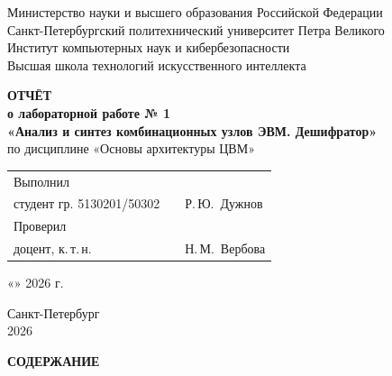 \documentclass[14pt,a4paper]{extarticle}
\makeatletter
\renewcommand{\tableofcontents}{%
  {\centering\textbf{СОДЕРЖАНИЕ}\par}\vspace{12pt}%
  \@starttoc{toc}}
\newcommand{\StudentGroup}{5130201/50302}
\makeatother
\begin{document}
\begin{titlepage}
\begin{singlespace}
\begin{center}
Министерство науки и высшего образования Российской Федерации\\[2pt]
Санкт-Петербургский политехнический университет Петра Великого\\[2pt]
Институт компьютерных наук и кибербезопасности\\[2pt]
Высшая школа технологий искусственного интеллекта

\vspace{5cm}

\textbf{ОТЧЁТ}\\[6pt]
\textbf{о лабораторной работе № 1}\\[12pt]
\textbf{«Анализ и синтез комбинационных узлов ЭВМ. Дешифратор»}\\[12pt]
по дисциплине «Основы архитектуры ЦВМ»
\end{center}

\vspace{4cm}

\noindent
\begin{tabular}{@{}p{7.2cm}p{3.6cm}l@{}}
Выполнил\\
студент гр. \StudentGroup & \underline{\hspace{3cm}} & Р.\,Ю.~Дужнов\\[22pt]
Проверил\\
доцент, к.\,т.\,н. & \underline{\hspace{3cm}} & Н.\,М.~Вербова\\
\end{tabular}

\vspace{1.2cm}
\noindent\hfill «\underline{\hspace{0.9cm}}» \underline{\hspace{3.2cm}} 2026 г.

\vfill
\begin{center}
Санкт-Петербург\\
2026
\end{center}
\end{singlespace}
\end{titlepage}
\setcounter{page}{2}

\begin{singlespace}
\tableofcontents
\end{singlespace}
\end{document}
